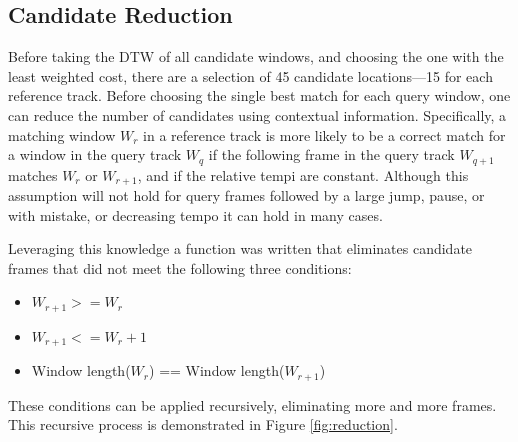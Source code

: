 \documentclass{article}
\begin{document}
\subsection{Candidate Reduction}
\label{sec:reduction}
Before taking the DTW of all candidate windows, and choosing the one with the least weighted cost, there are a selection of 45 candidate locations---15 for each reference track. Before choosing the single best match for each query window, one can reduce the number of candidates using contextual information.  Specifically, a matching window $W_r$ in a reference track is more likely to be a correct match for a window in the query track $W_q$ if the following frame in the query track $W_{q+1}$ matches $W_r$ or $W_{r+1}$, and if the relative tempi are constant. Although this assumption will not hold for query frames followed by a large jump, pause, or with mistake, or decreasing tempo it can hold in many cases.

Leveraging this knowledge a function was written that eliminates candidate frames that did not meet the following three conditions:
\begin{itemize}
\item $W_{r+1} >= W_r$
\item $W_{r+1} <= W_r + 1$
\item Window length($W_r$) == Window length($W_{r+1}$)
\end{itemize}

These conditions can be applied recursively, eliminating more and more frames. This recursive process is demonstrated in Figure \ref{fig:reduction}.
\end{document}
